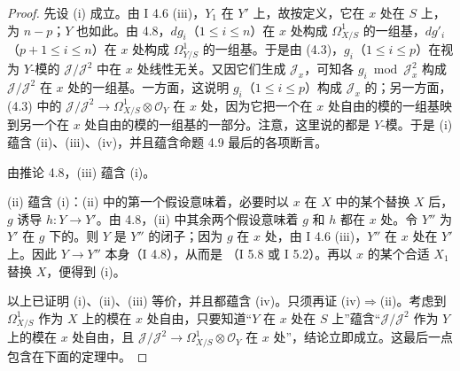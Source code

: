\begin{proof}
先设 (i) 成立。由 I 4.6 (iii)，$Y_1$ 在 $Y'$ 上，故按定义，它在 $x$ 处在 $S$ 上，为 $n-p$；$Y$ 也如此。由 4.8，$dg_i$（$1\leq i\leq n$）在 $x$ 处构成 $\Omega^1_{X/S}$ 的一组基，$dg'_i$（$p+1\leq i\leq n$）在 $x$ 处构成 $\Omega^1_{Y/S}$ 的一组基。于是由 (4.3)，$g_i$（$1\leq i\leq p$）在视为 $Y$-模的 $\mathcal J/\mathcal J^2$ 中在 $x$ 处线性无关。又因它们生成 $\mathcal J_x$，可知各 $g_i\bmod\mathcal J_x^2$ 构成 $\mathcal J/\mathcal J^2$ 在 $x$ 处的一组基。一方面，这说明 $g_i$（$1\leq i\leq p$）构成 $\mathcal J_x$ 的；另一方面，(4.3) 中的 $\mathcal J/\mathcal J^2\to\Omega^1_{X/S}\otimes\mathcal O_Y$ 在 $x$ 处，因为它把一个在 $x$ 处自由的模的一组基映到另一个在 $x$ 处自由的模的一组基的一部分。注意，这里说的都是 $Y$-模。于是 (i) 蕴含 (ii)、(iii)、(iv)，并且蕴含命题 4.9 最后的各项断言。

由推论 4.8，(iii) 蕴含 (i)。

(ii) 蕴含 (i)：(ii) 中的第一个假设意味着，必要时以 $x$ 在 $X$ 中的某个替换 $X$ 后，$g$ 诱导 $h:Y\to Y'$。由 4.8，(ii) 中其余两个假设意味着 $g$ 和 $h$ 都在 $x$ 处。令 $Y''$ 为 $Y'$ 在 $g$ 下的。则 $Y$ 是 $Y''$ 的闭子；因为 $g$ 在 $x$ 处，由 I 4.6 (iii)，$Y''$ 在 $x$ 处在 $Y'$ 上。因此 $Y\to Y''$ 本身（I 4.8），从而是
（I 5.8 或 I 5.2）。再以 $x$ 的某个合适 $X_1$ 替换 $X$，便得到 (i)。

以上已证明 (i)、(ii)、(iii) 等价，并且都蕴含 (iv)。只须再证 (iv)$\Rightarrow$(ii)。考虑到 $\Omega^1_{X/S}$ 作为 $X$ 上的模在 $x$ 处自由，只要知道“$Y$ 在 $x$ 处在 $S$ 上”蕴含“$\mathcal J/\mathcal J^2$ 作为 $Y$ 上的模在 $x$ 处自由，且 $\mathcal J/\mathcal J^2\to\Omega^1_{X/S}\otimes\mathcal O_Y$ 在 $x$ 处”，结论立即成立。这最后一点包含在下面的定理中。
\end{proof}

